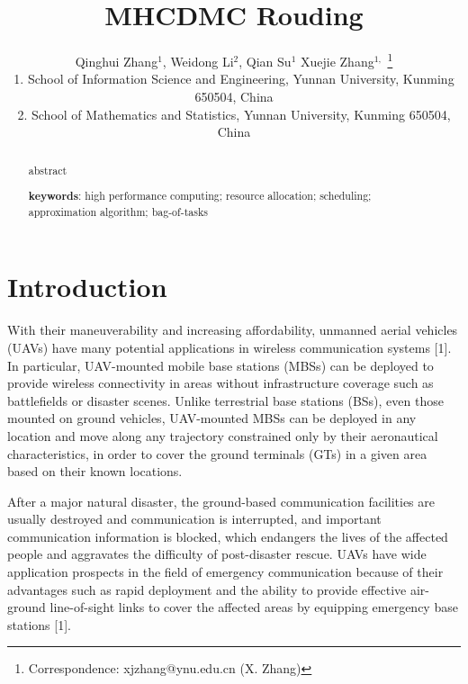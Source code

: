 \documentclass[11pt,a4paper]{article}
\title{MHCDMC Rouding}
\author{Qinghui Zhang$^1$, Weidong Li$^2$, Qian Su$^1$ Xuejie Zhang$^{1,}$ \thanks{Correspondence: xjzhang@ynu.edu.cn (X. Zhang)}\\
{\small 1. School of Information Science and Engineering, Yunnan University, Kunming 650504,  China}\\
{\small 2. School of Mathematics and Statistics,  Yunnan University, Kunming 650504, China}}
\begin{document}
\maketitle


\begin{abstract}
abstract

{\bf keywords}: high performance computing; resource allocation;
scheduling; approximation algorithm; bag-of-tasks
\end{abstract}
\newpage
	\section{Introduction}
	
	
	With their maneuverability and increasing affordability, unmanned aerial vehicles (UAVs) have many potential applications in wireless communication systems [1]. In particular, UAV-mounted mobile base stations (MBSs) can be deployed to provide wireless connectivity in areas without infrastructure coverage such as battlefields or disaster scenes. Unlike terrestrial base stations (BSs), even those mounted on ground vehicles, UAV-mounted MBSs can be deployed in any location and move along any trajectory constrained only by their aeronautical characteristics, in order to cover the ground terminals (GTs) in a given area based on their known locations.
	
	After a major natural disaster, the ground-based communication facilities are usually destroyed and communication is interrupted, and important communication information is blocked, which endangers the lives of the affected people and aggravates the difficulty of post-disaster rescue. UAVs have wide application prospects in the field of emergency communication because of their advantages such as rapid deployment and the ability to provide effective air-ground line-of-sight links to cover the affected areas by equipping emergency base stations [1].
	
\end{document}
